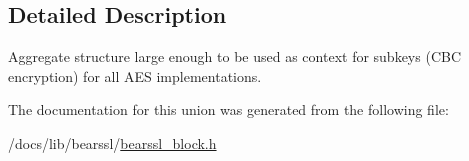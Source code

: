 \subsection{Detailed Description}
Aggregate structure large enough to be used as context for subkeys (C\+BC encryption) for all A\+ES implementations. 

The documentation for this union was generated from the following file\+:\begin{DoxyCompactItemize}
\item 
/docs/lib/bearssl/\hyperlink{bearssl__block_8h}{bearssl\+\_\+block.\+h}\end{DoxyCompactItemize}
